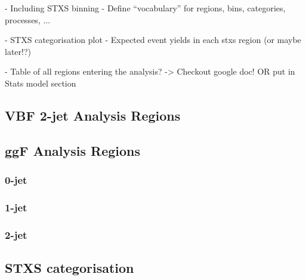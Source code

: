 - Including STXS binning
- Define ``vocabulary'' for regions, bins, categories, processes, ...

- STXS categorisation plot
- Expected event yields in each stxs region (or maybe later!?)

- Table of all regions entering the analysis? -> Checkout google doc! OR put in Stats model section

\subsection{VBF 2-jet Analysis Regions}
\subsection{ggF Analysis Regions}
\subsubsection{0-jet}
\subsubsection{1-jet}
\subsubsection{2-jet}

\subsection{STXS categorisation}